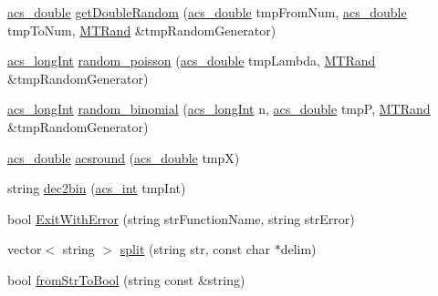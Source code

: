 \begin{DoxyCompactItemize}
\item 
\hyperlink{a00050_ab776853a005fcbf56af0424a2a4dd607}{acs\+\_\+double} \hyperlink{a00056_aed308af1d3ee40e106e4e23e78644d07}{get\+Double\+Random} (\hyperlink{a00050_ab776853a005fcbf56af0424a2a4dd607}{acs\+\_\+double} tmp\+From\+Num, \hyperlink{a00050_ab776853a005fcbf56af0424a2a4dd607}{acs\+\_\+double} tmp\+To\+Num, \hyperlink{a00015}{M\+T\+Rand} \&tmp\+Random\+Generator)
\item 
\hyperlink{a00050_a19319d75f02db4308bc5c0026d98cd85}{acs\+\_\+long\+Int} \hyperlink{a00056_a22cddb6ffcf2250e0c90bc913728350f}{random\+\_\+poisson} (\hyperlink{a00050_ab776853a005fcbf56af0424a2a4dd607}{acs\+\_\+double} tmp\+Lambda, \hyperlink{a00015}{M\+T\+Rand} \&tmp\+Random\+Generator)
\item 
\hyperlink{a00050_a19319d75f02db4308bc5c0026d98cd85}{acs\+\_\+long\+Int} \hyperlink{a00056_a78d5b4a67b6e66b8ceaa85874a2a12b7}{random\+\_\+binomial} (\hyperlink{a00050_a19319d75f02db4308bc5c0026d98cd85}{acs\+\_\+long\+Int} n, \hyperlink{a00050_ab776853a005fcbf56af0424a2a4dd607}{acs\+\_\+double} tmp\+P, \hyperlink{a00015}{M\+T\+Rand} \&tmp\+Random\+Generator)
\item 
\hyperlink{a00050_ab776853a005fcbf56af0424a2a4dd607}{acs\+\_\+double} \hyperlink{a00056_a277c801cb0f8a290d7c28b6a67feff18}{acsround} (\hyperlink{a00050_ab776853a005fcbf56af0424a2a4dd607}{acs\+\_\+double} tmp\+X)
\item 
string \hyperlink{a00056_a1a13653eb649b6fc74090deecddf1028}{dec2bin} (\hyperlink{a00050_a8d277355641a098190360234e2ebde35}{acs\+\_\+int} tmp\+Int)
\item 
bool \hyperlink{a00056_aa678d0a98232158c48108227b98de4b6}{Exit\+With\+Error} (string str\+Function\+Name, string str\+Error)
\item 
vector$<$ string $>$ \hyperlink{a00056_a4d1aa74fac80ae0275c056575fdb6626}{split} (string str, const char $\ast$delim)
\item 
bool \hyperlink{a00056_aed580149796de6350e6fcfae9b2adb30}{from\+Str\+To\+Bool} (string const \&string)
\end{DoxyCompactItemize}


